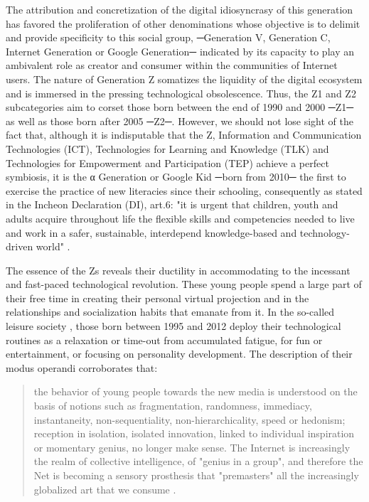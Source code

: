 \documentclass[english]{textolivre}
\begin{document}
The attribution and concretization of the digital idiosyncrasy of this generation has favored the proliferation of other denominations whose objective is to delimit and provide specificity to this social group, ─Generation V, Generation C, Internet Generation or Google Generation─ indicated by its capacity to play an ambivalent role as creator and consumer within the communities of Internet users. The nature of Generation Z somatizes the liquidity of the digital ecosystem \cite{bauman_retos_2005} and is immersed in the pressing technological obsolescence. Thus, the Z1 and Z2 subcategories \cite{masco_entre_2012} aim to corset those born between the end of 1990 and 2000 ─Z1─ as well as those born after 2005 ─Z2─. However, we should not lose sight of the fact that, although it is indisputable that the Z, Information and Communication Technologies (ICT), Technologies for Learning and Knowledge (TLK) and Technologies for Empowerment and Participation (TEP) achieve a perfect symbiosis, it is the α Generation or Google Kid \cite{grail2011consumers} ─born from 2010─ the first to exercise the practice of new literacies \cite{street2004escolarizacion} since their schooling, consequently as stated in the Incheon Declaration (DI), art.6: "it is urgent that children, youth and adults acquire throughout life the flexible skills and competencies needed to live and work in a safer, sustainable, interdepend knowledge-based and technology-driven world" \cite[p.26]{unesco_literacy_2006}.

The essence of the Zs reveals their ductility in accommodating to the incessant and fast-paced technological revolution. These young people spend a large part of their free time in creating their personal virtual projection and in the relationships and socialization habits that emanate from it. In the so-called leisure society \cite{gubern_eros_2000}, those born between 1995 and 2012 deploy their technological routines as a relaxation or time-out from accumulated fatigue, for fun or entertainment, or focusing on personality development. The description of their modus operandi corroborates that:

\begin{quote}
    the behavior of young people towards the new media is understood on the basis of notions such as fragmentation, randomness, immediacy, instantaneity, non-sequentiality, non-hierarchicality, speed or hedonism; reception in isolation, isolated innovation, linked to individual inspiration or momentary genius, no longer make sense. The Internet is increasingly the realm of collective intelligence, of "genius in a group", and therefore the Net is becoming a sensory prosthesis that "premasters" all the increasingly globalized art that we consume \cite[p.430]{efron2010jovenes}.
\end{quote}
\end{document}
